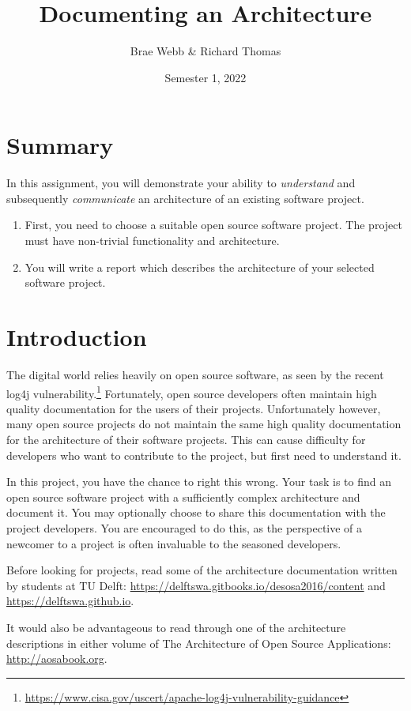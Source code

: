 \documentclass{csse4400}
\title{Documenting an Architecture}
\author{Brae Webb \& Richard Thomas}
\date{Semester 1, 2022}
\begin{document}
\maketitle

\section*{Summary}
In this assignment, you will demonstrate your ability to \textsl{understand}
and subsequently \textsl{communicate} an architecture of an existing software project.
\begin{enumerate}
    \item First, you need to choose a suitable open source software project.
             The project must have non-trivial functionality and architecture.
    \item You will write a report which describes the architecture of your selected software project.
\end{enumerate}

\section{Introduction}
The digital world relies heavily on open source software, as seen by the recent log4j vulnerability.\footnote{\url{https://www.cisa.gov/uscert/apache-log4j-vulnerability-guidance}}
Fortunately, open source developers often maintain high quality documentation for the users of their projects.
Unfortunately however, many open source projects do not maintain the same high quality documentation for the architecture of their software projects.
This can cause difficulty for developers who want to contribute to the project, but first need to understand it.

In this project, you have the chance to right this wrong.
Your task is to find an open source software project with a sufficiently complex architecture and document it.
You may optionally choose to share this documentation with the project developers.
You are encouraged to do this, as the perspective of a newcomer to a project is often invaluable to the seasoned developers.

Before looking for projects, read some of the architecture documentation written by students at TU Delft:
\url{https://delftswa.gitbooks.io/desosa2016/content} and \url{https://delftswa.github.io}.

It would also be advantageous to read through one of the architecture descriptions in either volume of
The Architecture of Open Source Applications: \url{http://aosabook.org}.
\end{document}
